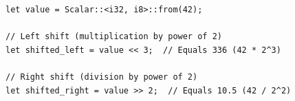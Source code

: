 \documentclass[12pt,letter]{article}
\begin{document}
\begin{lstlisting}[style=rust, caption={Scalar Bit Shift Operations in Rust}, label={fig:scalar_shifts}]
let value = Scalar::<i32, i8>::from(42);

// Left shift (multiplication by power of 2)
let shifted_left = value << 3;  // Equals 336 (42 * 2^3)

// Right shift (division by power of 2)
let shifted_right = value >> 2;  // Equals 10.5 (42 / 2^2)
\end{lstlisting}
\end{document}
